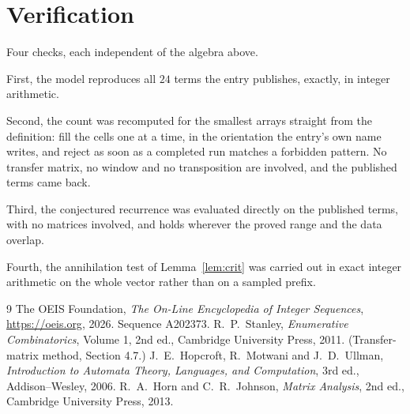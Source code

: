 \documentclass[11pt,a4paper]{article}
\theoremstyle{plain}
\theoremstyle{definition}
\begin{document}
\section{Verification}

Four checks, each independent of the algebra above.

First, the model reproduces all $24$ terms the entry publishes, exactly, in integer
arithmetic.

Second, the count was recomputed for the smallest arrays straight from the definition: fill the
cells one at a time, in the orientation the entry's own name writes, and reject as soon as a
completed run matches a forbidden pattern. No transfer matrix, no window and no transposition
are involved, and the published terms came back.

Third, the conjectured recurrence was evaluated directly on the published terms, with no
matrices involved, and holds wherever the proved range and the data overlap.

Fourth, the annihilation test of Lemma~\ref{lem:crit} was carried out in exact integer
arithmetic on the whole vector rather than on a sampled prefix.

\begin{thebibliography}{9}
 The OEIS Foundation, \emph{The On-Line Encyclopedia of Integer
Sequences}, \url{https://oeis.org}, 2026. Sequence A202373.
 R.~P.~Stanley, \emph{Enumerative Combinatorics}, Volume 1, 2nd ed.,
Cambridge University Press, 2011. (Transfer-matrix method, Section 4.7.)
 J.~E.~Hopcroft, R.~Motwani and J.~D.~Ullman, \emph{Introduction to Automata
Theory, Languages, and Computation}, 3rd ed., Addison--Wesley, 2006.
 R.~A.~Horn and C.~R.~Johnson, \emph{Matrix Analysis}, 2nd ed., Cambridge
University Press, 2013.
\end{thebibliography}
\end{document}

